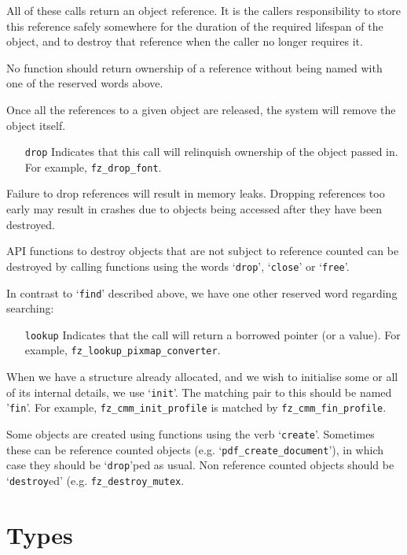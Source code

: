 \documentclass[oneside]{book}
\begin{document}
All of these calls return an object reference. It is the callers responsibility to store this reference safely somewhere for the duration of the required lifespan of the object, and to destroy that reference when the caller no longer requires it.

No function should return ownership of a reference without being named with one of the reserved words above.

Once all the references to a given object are released, the system will remove the object itself.

\begin{itemize}
\item[\texttt{drop}] Indicates that this call will relinquish ownership of the object passed in. For example, \texttt{fz\_drop\_font}.
\end{itemize}

Failure to drop references will result in memory leaks. Dropping references too early may result in crashes due to objects being accessed after they have been destroyed.

API functions to destroy objects that are not subject to reference counted can be destroyed by calling functions using the words `\texttt{drop}', `\texttt{close}' or `\texttt{free}'.

In contrast to `\texttt{find}' described above, we have one other reserved word regarding searching:

\begin{itemize}
\item[\texttt{lookup}] Indicates that the call will return a borrowed pointer (or a value). For example, \texttt{fz\_lookup\_pixmap\_converter}.
\end{itemize}

When we have a structure already allocated, and we wish to initialise some or all of its internal details, we use `\texttt{init}'. The matching pair to this should be named '\texttt{fin}'. For example, \texttt{fz\_cmm\_init\_profile} is matched by \texttt{fz\_cmm\_fin\_profile}.

Some objects are created using functions using the verb `\texttt{create}'. Sometimes these can be reference counted objects (e.g. `\texttt{pdf\_create\_document}'), in which case they should be `\texttt{drop}'ped as usual. Non reference counted objects should be `\texttt{destroy}ed' (e.g. \texttt{fz\_destroy\_mutex}.

\section{Types}
\end{document}
